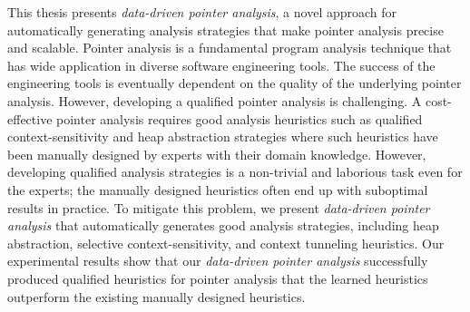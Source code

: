 This thesis presents {\em data-driven pointer analysis}, a novel approach for automatically generating analysis strategies that make pointer analysis precise and scalable. 
Pointer analysis is a fundamental program analysis technique that has wide application in diverse software engineering tools. The success of the engineering tools is eventually dependent on the quality of the underlying pointer analysis.
However, developing a qualified pointer analysis is challenging.
A cost-effective pointer analysis requires good analysis heuristics such as qualified context-sensitivity and heap abstraction strategies where
such heuristics have been manually designed by experts with their domain knowledge.
However, developing qualified analysis strategies is a non-trivial and laborious task even for the experts; the manually designed heuristics often end up with suboptimal results in practice.
To mitigate this problem, we present {\em data-driven pointer analysis} that automatically generates good analysis strategies, including heap abstraction, selective context-sensitivity, and context tunneling heuristics.
Our experimental results show that our {\em data-driven pointer analysis} successfully produced qualified heuristics for pointer analysis that the learned heuristics outperform the existing manually designed heuristics.









